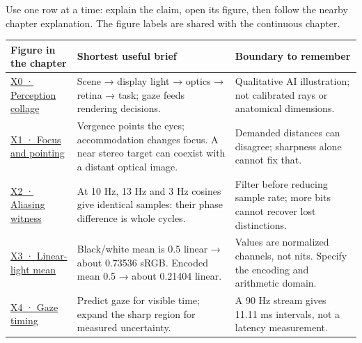 \hypertarget{appendix-73c6b8ed5a87-figure-linked-short-notes}{}

Use one row at a time: explain the claim, open its figure, then follow the nearby chapter explanation. The figure labels are shared with the continuous chapter.

{\def\LTcaptype{none} %
\begin{longtable}[]{@{}
  >{\raggedright\arraybackslash}p{}
  >{\raggedright\arraybackslash}p{}
  >{\raggedright\arraybackslash}p{}@{}}
\toprule\noalign{}
\begin{minipage}[b]{\linewidth}\raggedright
Figure in the chapter
\end{minipage} & \begin{minipage}[b]{\linewidth}\raggedright
Shortest useful brief
\end{minipage} & \begin{minipage}[b]{\linewidth}\raggedright
Boundary to remember
\end{minipage} \\
\midrule\noalign{}
\endhead
\bottomrule\noalign{}
\endlastfoot
\hyperref[04-visual-computing-ii-ch042-figure-x0-a-qualitative-picture-of-the-xr-loop]{X0 · Perception collage} & Scene → display light → optics → retina → task; gaze feeds rendering decisions. & Qualitative AI illustration; not calibrated rays or anatomical dimensions. \\
\hyperref[04-visual-computing-ii-ch042-figure-x1-two-simultaneous-depth-demands]{X1 · Focus and pointing} & Vergence points the eyes; accommodation changes focus. A near stereo target can coexist with a distant optical image. & Demanded distances can disagree; sharpness alone cannot fix that. \\
\hyperref[04-visual-computing-ii-ch042-figure-x2-the-samples-cannot-name-their-original]{X2 · Aliasing witness} & At 10 Hz, 13 Hz and 3 Hz cosines give identical samples: their phase difference is whole cycles. & Filter before reducing sample rate; more bits cannot recover lost distinctions. \\
\hyperref[04-visual-computing-ii-ch042-figure-x3-same-endpoints-different-averaging-domain]{X3 · Linear-light mean} & Black/white mean is 0.5 linear → about 0.73536 sRGB. Encoded mean 0.5 → about 0.21404 linear. & Values are normalized channels, not nits. Specify the encoding and arithmetic domain. \\
\hyperref[04-visual-computing-ii-ch042-figure-x4-aim-detail-at-visible-time]{X4 · Gaze timing} & Predict gaze for visible time; expand the sharp region for measured uncertainty. & A 90 Hz stream gives 11.11 ms intervals, not a latency measurement. \\
\end{longtable}
}

